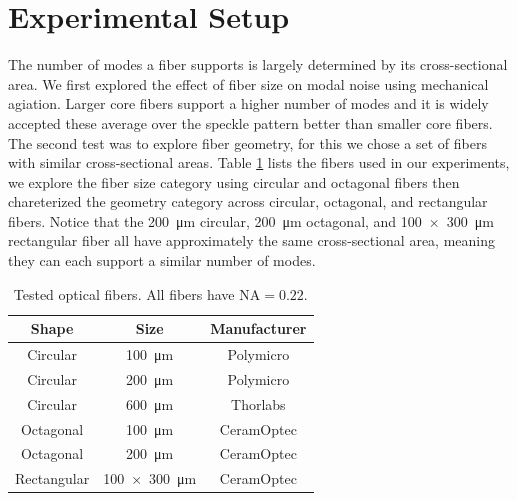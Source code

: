 \documentclass[twocolumn]{emulateapj}
\begin{document}
\section{Experimental Setup}
\label{sec:experimental_setup}

The number of modes a fiber supports is largely determined by its cross-sectional area. We first explored the effect of fiber size on modal noise using mechanical agiation. Larger core fibers support a higher number of modes and it is widely accepted these average over the speckle pattern better than smaller core fibers. The second test was to explore fiber geometry, for this we chose a set of fibers with similar cross-sectional areas. Table \ref{table:fibers} lists the fibers used in our experiments, we explore the fiber size category using circular and octagonal fibers then chareterized the geometry category across circular, octagonal, and rectangular fibers. Notice that the \SI{200}{\micro\meter} circular, \SI{200}{\micro\meter} octagonal, and \SI{100x300}{\micro\meter} rectangular fiber all have approximately the same cross-sectional area, meaning they can each support a similar number of modes.

\begin{table}
\centering
\caption{Tested optical fibers. All fibers have $\mathrm{NA} = 0.22$.}
	\begin{tabular}{ccc}
	\hline
	Shape & Size & Manufacturer \\
	\hline
	\hline
	Circular & \SI{100}{\micro\meter} & Polymicro \\
	Circular & \SI{200}{\micro\meter} & Polymicro \\
	Circular & \SI{600}{\micro\meter} & Thorlabs \\
	Octagonal & \SI{100}{\micro\meter} & CeramOptec \\
	Octagonal & \SI{200}{\micro\meter} & CeramOptec \\
	Rectangular & \SI{100x300}{\micro\meter} & CeramOptec \\
	\hline
	\end{tabular}
\label{table:fibers}
\end{table}
\end{document}
